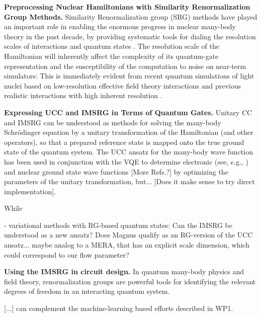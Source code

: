 \documentclass[10pt]{article}
\newcommand{\tbd}[1]{{\color{red}#1}}
\begin{document}
\textbf{Preprocessing Nuclear Hamiltonians with Similarity Renormalization Group Methods.} Similarity Renormalization group (SRG) methods have played an important role in enabling the enormous progress in nuclear many-body theory in the past decade, by providing systematic tools for dialing the resolution scales of interactions and quantum states \cite{Bogner:2010pq,Hergert:2016jk,Hergert:2017kx,Stroberg:2019mx}. The resolution scale of the Hamiltonian will inherently affect the complexity of its quantum-gate representation and the susceptibility of the computation to noise on near-term simulators: This is immediately evident from recent quantum simulations of light nuclei based on low-resolution effective field theory interactions \cite{Dumitrescu:2018az,Lu:2018aq} and previous realistic interactions with high inherent resolution \cite{Roggero:2019sr}.




\textbf{Expressing UCC and IMSRG in Terms of Quantum Gates.} Unitary CC and IMSRG can be understood as methods for solving the many-body Schr\"odinger equation by a unitary transformation of the Hamiltonian (and other operators), so that a prepared reference state is mapped onto the true ground state of the quantum system. The UCC ansatz for the many-body wave function has been used in conjunction with the VQE to determine electronic (see, e.g., \cite{Wecker:2015bk,McClean:2016qr,Lee:2019dd}) and nuclear ground state wave functions \cite{Dumitrescu:2018az,Lu:2018aq} \tbd{[More Refs.?]} by optimizing the parameters of the unitary transformation, \tbd{but... [Does it make sense to try direct implementation]}. 

While 

\tbd{\cite{Dawson:2008td} - variational methods with RG-based quantum states: Can the IMSRG be understood as a new ansatz? Does Magnus qualify as an RG-version of the UCC ansatz... maybe analog to a MERA, that has an explicit scale dimension, which could correspond to our flow parameter?}

\textbf{Using the IMSRG in circuit design.} In quantum many-body physics and field theory, renormalization groups are powerful tools for identifying the relevant degrees of freedom in an interacting quantum system. 

\tbd{[...] can complement the machine-learning based efforts described in WP1.}
\end{document}
